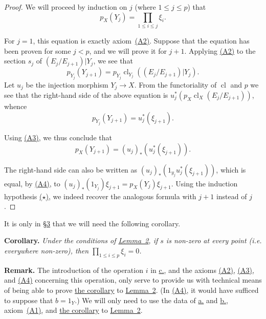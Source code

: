 \documentclass{article}
\newenvironment{itenv}[1]
  {\phantomsection\par\medskip\noindent\textbf{#1.}\itshape}
  {\par\medskip}
\newenvironment{rmenv}[1]
  {\phantomsection\par\medskip\noindent\textbf{#1.}\rmfamily}
  {\par\medskip}
\renewcommand{\leq}{\leqslant}
\DeclareMathOperator{\cl}{cl}
\newcommand{\oldpage}[1]{\marginpar{\footnotesize$\Big\vert$ \textit{p.~#1}}}
\begin{document}
\begin{proof}
  We will proceed by induction on $j$ (where $1\leq j\leq p$) that
  \[
    \label{lemma2equationstar}
    p_X(Y_j) = \prod_{1\leq i\leq j}\xi_i.
    \tag{$\star$}
  \]

  For $j=1$, this equation is exactly axiom~\hyperref[axiomA2]{(A2)}.
  Suppose that the equation has been proven for some $j<p$, and we will prove it for $j+1$.
  Applying \hyperref[axiomA2]{(A2)} to the section $s_j$ of $(E_j/E_{j+1})|Y_j$, we see that
  \[
    p_{Y_j}(Y_{j+1}) = p_{Y_j}\cl_{Y_j}((E_j/E_{j+1})|Y_j).
  \]
  Let $u_j$ be the injection morphism $Y_j\to X$.
  From the functoriality of $\cl$ and $p$ we see that the right-hand side of the above equation is $u_j^*(p_X\cl_X(E_j/E_{j+1}))$, whence
  \[
    p_{Y_j}(Y_{j+1}) = u_j^*(\xi_{j+1}).
  \]

  \oldpage{142}
  Using \hyperref[axiomA3]{(A3)}, we thus conclude that
  \[
    p_X(Y_{j+1}) = (u_j)_*(u_j^*(\xi_{j+1})).
  \]

  The right-hand side can also be written as $(u_j)_*(1_{y_j}u_j^*(\xi_{j+1}))$, which is equal, by \hyperref[axiomA4]{(A4)}, to $(u_j)_*(1_{Y_j})\xi_{j+1} = p_X(Y_j)\xi_{j+1}$.
  Using the induction hypothesis \hyperref[lemma2equationstar]{($\star$)}, we indeed recover the analogous formula with $j+1$ instead of $j$.
\end{proof}

It is only in \hyperref[section3]{\S3} that we will need the following corollary.
\begin{itenv}{Corollary}
\label{lemma2corollary}
  Under the conditions of \hyperref[lemma2]{Lemma~2}, if $s$ is non-zero at every point (i.e. everywhere non-zero), then $\prod_{1\leq i\leq p}\xi_i=0$.
\end{itenv}

\begin{rmenv}{Remark}
  The introduction of the operation $i$ in \hyperref[datac]{c.}, and the axioms \hyperref[axiomA2]{(A2)}, \hyperref[axiomA3]{(A3)}, and \hyperref[axiomA4]{(A4)} concerning this operation, only serve to provide us with technical means of being able to prove \hyperref[lemma2corollary]{the corollary} to \hyperref[lemma2]{Lemma~2}.
  (In \hyperref[axiomA4]{(A4)}, it would have sufficed to suppose that $b=1_Y$.)
  We will only need to use the data of \hyperref[dataa]{a.} and \hyperref[datab]{b.}, axiom~\hyperref[axiomA2]{(A1)}, and \hyperref[lemma2corollary]{the corollary} to \hyperref[lemma2]{Lemma~2}.
\end{rmenv}
\end{document}
